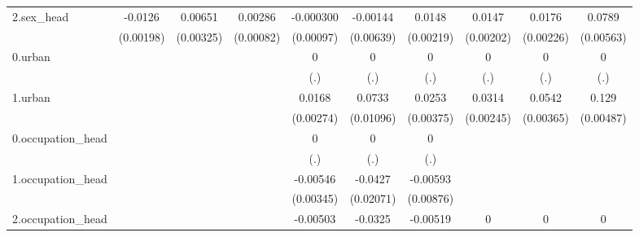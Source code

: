 \begin{table}[htbp]
\begin{tabular}{l*{9}{c}}
2.sex\_head  &     -0.0126\sym{***}&     0.00651\sym{**} &     0.00286\sym{***}&   -0.000300         &    -0.00144         &      0.0148\sym{***}&      0.0147\sym{***}&      0.0176\sym{***}&      0.0789\sym{***}\\
            &   (0.00198)         &   (0.00325)         &   (0.00082)         &   (0.00097)         &   (0.00639)         &   (0.00219)         &   (0.00202)         &   (0.00226)         &   (0.00563)         \\
0.urban     &                     &                     &                     &           0         &           0         &           0         &           0         &           0         &           0         \\
            &                     &                     &                     &         (.)         &         (.)         &         (.)         &         (.)         &         (.)         &         (.)         \\
1.urban     &                     &                     &                     &      0.0168\sym{***}&      0.0733\sym{***}&      0.0253\sym{***}&      0.0314\sym{***}&      0.0542\sym{***}&       0.129\sym{***}\\
            &                     &                     &                     &   (0.00274)         &   (0.01096)         &   (0.00375)         &   (0.00245)         &   (0.00365)         &   (0.00487)         \\
0.occupation\_head&                     &                     &                     &           0         &           0         &           0         &                     &                     &                     \\
            &                     &                     &                     &         (.)         &         (.)         &         (.)         &                     &                     &                     \\
1.occupation\_head&                     &                     &                     &    -0.00546         &     -0.0427\sym{**} &    -0.00593         &                     &                     &                     \\
            &                     &                     &                     &   (0.00345)         &   (0.02071)         &   (0.00876)         &                     &                     &                     \\
2.occupation\_head&                     &                     &                     &    -0.00503\sym{***}&     -0.0325\sym{***}&    -0.00519         &           0         &           0         &           0         \\

\end{tabular}
\end{table}

